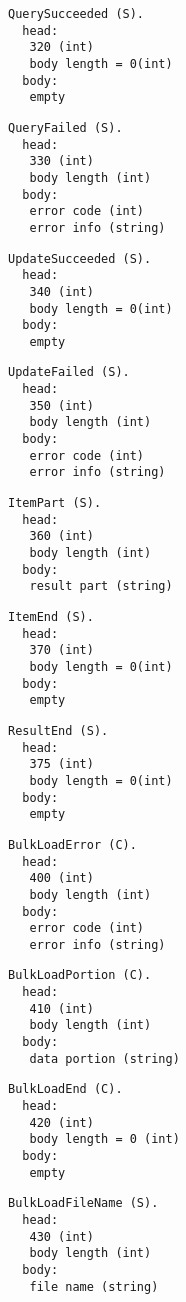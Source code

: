 \documentclass[a4paper,12pt]{article}
\begin{document}
\begin{verbatim}
QuerySucceeded (S).
  head:
   320 (int)
   body length = 0(int)
  body:
   empty
\end{verbatim}

\begin{verbatim}
QueryFailed (S).
  head:
   330 (int)
   body length (int)
  body:
   error code (int)
   error info (string)
\end{verbatim}

\begin{verbatim}
UpdateSucceeded (S).
  head:
   340 (int)
   body length = 0(int)
  body:
   empty
\end{verbatim}

\begin{verbatim}
UpdateFailed (S).
  head:
   350 (int)
   body length (int)
  body:
   error code (int)
   error info (string)
\end{verbatim}

\begin{verbatim}
ItemPart (S).
  head:
   360 (int)
   body length (int)
  body:
   result part (string)
\end{verbatim}

\begin{verbatim}
ItemEnd (S).
  head:
   370 (int)
   body length = 0(int)
  body:
   empty
\end{verbatim}

\begin{verbatim}
ResultEnd (S).
  head:
   375 (int)
   body length = 0(int)
  body:
   empty
\end{verbatim}

\begin{verbatim}
BulkLoadError (C).
  head:
   400 (int)
   body length (int)
  body:
   error code (int)
   error info (string)
\end{verbatim}

\begin{verbatim}
BulkLoadPortion (C).
  head:
   410 (int)
   body length (int)
  body:
   data portion (string)
\end{verbatim}

\begin{verbatim}
BulkLoadEnd (C).
  head:
   420 (int)
   body length = 0 (int)
  body:
   empty
\end{verbatim}

\begin{verbatim}
BulkLoadFileName (S).
  head:
   430 (int)
   body length (int)
  body:
   file name (string)
\end{verbatim}
\end{document}
